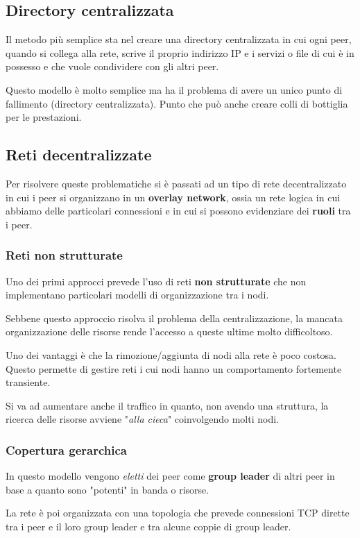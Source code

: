 \subsection{Directory centralizzata}
Il metodo più semplice sta nel creare una directory centralizzata in
cui ogni peer, quando si collega alla rete, scrive il proprio indirizzo
IP e i servizi o file di cui è in possesso e che vuole condividere con
gli altri peer.

Questo modello è molto semplice ma ha il problema di avere un unico 
punto di fallimento (directory centralizzata). Punto che può anche 
creare colli di bottiglia per le prestazioni.

\subsection{Reti decentralizzate}
Per risolvere queste problematiche si è passati ad un tipo di rete
decentralizzato in cui i peer si organizzano in un \textbf{overlay 
network}, ossia un rete logica in cui abbiamo delle particolari 
connessioni e in cui si possono evidenziare dei \textbf{ruoli} tra i
peer.

\subsubsection{Reti non strutturate}
Uno dei primi approcci prevede l'uso di reti \textbf{non strutturate}
che non implementano particolari modelli di organizzazione tra i nodi.

Sebbene questo approccio risolva il problema della centralizzazione,
la mancata organizzazione delle risorse rende l'accesso a queste 
ultime molto difficoltoso. 

Uno dei vantaggi è che la rimozione/aggiunta di nodi alla rete è poco
costosa. Questo permette di gestire reti i cui nodi hanno un 
comportamento fortemente transiente.

Si va ad aumentare anche il traffico in quanto, non avendo una
struttura, la ricerca delle risorse avviene "\emph{alla cieca}"
coinvolgendo molti nodi.

\subsubsection{Copertura gerarchica}
In questo modello vengono \emph{eletti} dei peer come \textbf{group
leader} di altri peer in base a quanto sono "potenti" in banda o
risorse.

La rete è poi organizzata con una topologia che prevede connessioni TCP
dirette tra i peer e il loro group leader e tra alcune coppie di group
leader.

